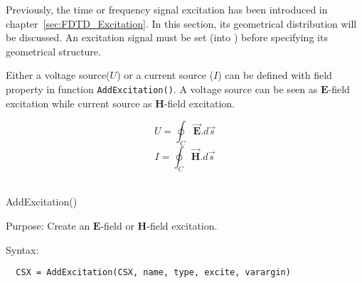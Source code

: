 Previously, the time or frequency signal excitation has been introduced in chapter~\ref{sec:FDTD_Excitation}. In this section, its geometrical distribution will be discussed. An excitation signal must be set (into ) before specifying its geometrical structure. 

Either a voltage source($U$) or a current source ($I$) can be defined with field property in function \texttt{AddExcitation()}. A voltage source can be seen as 
$\mathbf{E}$-field excitation while current source as $\mathbf{H}$-field excitation. 

    \begin{equation}
    U=\oint_{C}\vec{\mathbf{E}}.d\overrightarrow{s}
    \end{equation}
    \begin{equation}
    I=\oint_{C}\vec{\mathbf{H}}.d\overrightarrow{s}
    \end{equation}\\

\begin{FontNameFunct}{AddExcitation()}
\end{FontNameFunct}

\begin{FontDescr}{Purpose:}
Create an $\mathbf{E}$-field or $\mathbf{H}$-field excitation.
\end{FontDescr}

\begin{FontDescr}{Syntax:}
  \begin{lstlisting}
  CSX = AddExcitation(CSX, name, type, excite, varargin)
  \end{lstlisting}
\end{FontDescr}

